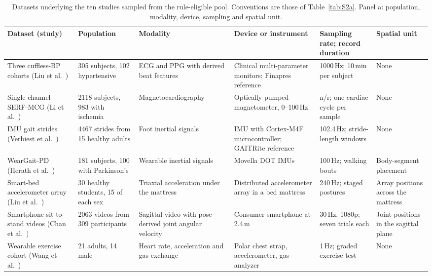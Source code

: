 \documentclass[journal]{IEEEtran}
\renewcommand{\thetable}{S\arabic{table}}
\begin{document}
\begin{table}[tbp]
\centering
\renewcommand{\thetable}{S4a}
\caption{Datasets underlying the ten studies sampled from the rule-eligible pool. Conventions are
those of Table~\ref{tab:S2a}. Panel a: population, modality, device, sampling and spatial unit.}
\label{tab:S4a}
\footnotesize
\setlength{\tabcolsep}{2.5pt}
\renewcommand{\arraystretch}{1.05}
\begin{tabularx}{\textwidth}{L{2.5cm} L{2.6cm} L{2.4cm} L{2.8cm} L{2.9cm} X}
\toprule
\textbf{Dataset (study)} & \textbf{Population} & \textbf{Modality} & \textbf{Device or instrument} & \textbf{Sampling rate; record duration} & \textbf{Spatial unit} \\
\midrule
Three cuffless-BP cohorts (Liu et al.~\cite{liu2024cignn}) & 305 subjects, 102 hypertensive & ECG and PPG with derived beat features & Clinical multi-parameter monitors; Finapres reference & 1000\,Hz; 10\,min per subject & None \\
\addlinespace[1pt]
Single-channel SERF-MCG (Li et al.~\cite{li2026edgeischemia}) & 2118 subjects, 983 with ischemia & Magneto\-cardio\-graphy & Optically pumped magnetometer, 0--100\,Hz & n/r; one cardiac cycle per sample & None \\
\addlinespace[1pt]
IMU gait strides (Verbiest et al.~\cite{verbiest2023gaitstride}) & 4467 strides from 15 healthy adults & Foot inertial signals & IMU with Cortex-M4F microcontroller; GAITRite reference & 102.4\,Hz; stride-length windows & None \\
\addlinespace[1pt]
WearGait-PD (Herath et al.~\cite{herath2026parkinson}) & 181 subjects, 100 with Parkinson's & Wearable inertial signals & Movella DOT IMUs & 100\,Hz; walking bouts & Body-segment placement \\
\addlinespace[1pt]
Smart-bed accelerometer array (Liu et al.~\cite{liu2025sleepposture}) & 30 healthy students, 15 of each sex & Triaxial acceleration under the mattress & Distributed accelerometer array in a bed mattress & 240\,Hz; staged postures & Array positions across the mattress \\
\addlinespace[1pt]
Smartphone sit-to-stand videos (Chan et al.~\cite{chan2026sitstand}) & 2063 videos from 309 participants & Sagittal video with pose-derived joint angular velocity & Consumer smartphone at 2.4\,m & 30\,Hz, 1080p; seven trials each & Joint positions in the sagittal plane \\
\addlinespace[1pt]
Wearable exercise cohort (Wang et al.~\cite{wang2025vo2}) & 21 adults, 14 male & Heart rate, acceleration and gas exchange & Polar chest strap, accelerometer, gas analyzer & 1\,Hz; graded exercise test & None \\

\end{tabularx}
\end{table}
\end{document}
